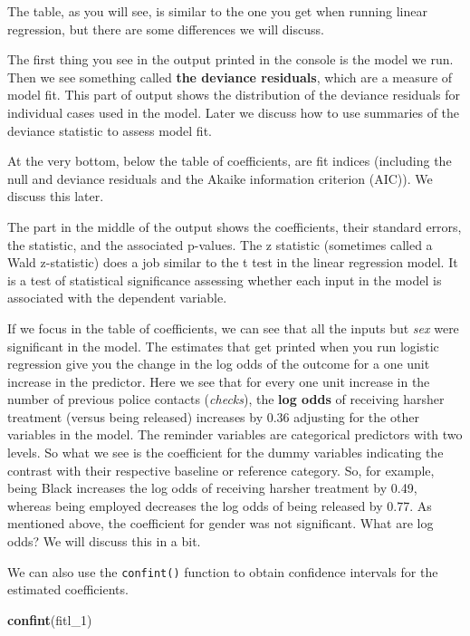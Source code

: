 \documentclass[
]{book}
\newenvironment{Shaded}{\begin{snugshade}}{\end{snugshade}}
\newcommand{\FunctionTok}[1]{\textcolor[rgb]{0.13,0.29,0.53}{\textbf{#1}}}
\newcommand{\NormalTok}[1]{#1}
\begin{document}
The table, as you will see, is similar to the one you get when running linear regression, but there are some differences we will discuss.

The first thing you see in the output printed in the console is the model we run. Then we see something called \textbf{the deviance residuals}, which are a measure of model fit. This part of output shows the distribution of the deviance residuals for individual cases used in the model. Later we discuss how to use summaries of the deviance statistic to assess model fit.

At the very bottom, below the table of coefficients, are fit indices (including the null and deviance residuals and the Akaike information criterion (AIC)). We discuss this later.

The part in the middle of the output shows the coefficients, their standard errors, the statistic, and the associated p-values. The z statistic (sometimes called a Wald z-statistic) does a job similar to the t test in the linear regression model. It is a test of statistical significance assessing whether each input in the model is associated with the dependent variable.

If we focus in the table of coefficients, we can see that all the inputs but \emph{sex} were significant in the model. The estimates that get printed when you run logistic regression give you the change in the log odds of the outcome for a one unit increase in the predictor. Here we see that for every one unit increase in the number of previous police contacts (\emph{checks}), the \textbf{log odds} of receiving harsher treatment (versus being released) increases by 0.36 adjusting for the other variables in the model. The reminder variables are categorical predictors with two levels. So what we see is the coefficient for the dummy variables indicating the contrast with their respective baseline or reference category. So, for example, being Black increases the log odds of receiving harsher treatment by 0.49, whereas being employed decreases the log odds of being released by 0.77. As mentioned above, the coefficient for gender was not significant. What are log odds? We will discuss this in a bit.

We can also use the \texttt{confint()} function to obtain confidence intervals for the estimated coefficients.

\begin{Shaded}
\begin{Highlighting}[]
\FunctionTok{confint}\NormalTok{(fitl\_1)}
\end{Highlighting}
\end{Shaded}
\end{document}
